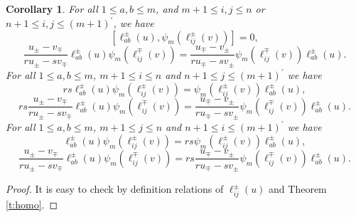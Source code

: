 \documentclass[10pt,a4paper]{amsart}
\newtheorem{coro}[theorem]{Corollary}
\numberwithin{equation}{section}
\begin{document}
\begin{coro}\label{c:15}
	For all $1 \leqslant a, b \leqslant m$, and $m+1 \leq i,j \leq n$ or $n+1 \leq i,j \leq(m+1)^{\prime}$, we have
	$$
	\left[\ell_{a b}^{ \pm}(u), \psi_m\left(\ell_{i j}^{ \pm}(v)\right)\right]=0,
	$$
	$$
	\frac{u_{ \pm}-v_{\mp}}{r u_{ \pm}-s v_{\mp}} \ell_{a b}^{ \pm}(u) \psi_m\left(\ell_{i j}^{\mp}(v)\right)=\frac{u_{\mp}-v_{ \pm}}{r u_{\mp}-s v_{ \pm}} \psi_m\left(\ell_{i j}^{\mp}(v)\right) \ell_{a b}^{ \pm}(u).
	$$
	For all $1 \leqslant a, b \leqslant m$, $m+1 \leq i \leq n$ and $n+1 \leq j \leq(m+1)^{\prime}$ we have
	$$
	r s \ell_{a b}^{ \pm}(u) \psi_m\left(\ell_{i j}^{ \pm}(v)\right)=\psi_m\left(\ell_{i j}^{ \pm}(v)\right) \ell_{a b}^{ \pm}(u),
	$$
	$$
	rs\frac{u_{ \pm}-v_{\mp}}{r u_{ \pm}-s v_{\mp}} \ell_{a b}^{ \pm}(u) \psi_m\left(\ell_{i j}^{\mp}(v)\right)=\frac{u_{\mp}-v_{ \pm}}{r u_{\mp}-s v_{ \pm}} \psi_m\left(\ell_{i j}^{\mp}(v)\right) \ell_{a b}^{ \pm}(u).
	$$
		For all $1 \leqslant a, b \leqslant m$, $m+1 \leq j \leq n$ and $n+1 \leq i \leq(m+1)^{\prime}$ we have
			$$
	 \ell_{a b}^{ \pm}(u) \psi_m\left(\ell_{i j}^{ \pm}(v)\right)=	r s\psi_m\left(\ell_{i j}^{ \pm}(v)\right) \ell_{a b}^{ \pm}(u),
		$$
		$$
		\frac{u_{ \pm}-v_{\mp}}{r u_{ \pm}-s v_{\mp}} \ell_{a b}^{ \pm}(u) \psi_m\left(\ell_{i j}^{\mp}(v)\right)=rs\frac{u_{\mp}-v_{ \pm}}{r u_{\mp}-s v_{ \pm}} \psi_m\left(\ell_{i j}^{\mp}(v)\right) \ell_{a b}^{ \pm}(u).
		$$
\end{coro}
\begin{proof}
	It is easy to check by definition relations of $\ell_{i j}^{ \pm}(u)$ and Theorem \ref{t:homo}.
\end{proof}
\end{document}
